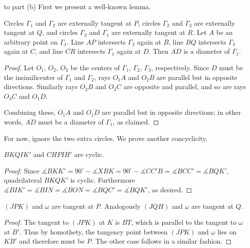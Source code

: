\begin{customsol}{to part (b)}
    First we present a well-known lemma.
    \begin{boxlemma*}[Folklore]
        Circles $\Gamma_1$ and $\Gamma_2$ are externally tangent at $P$, circles $\Gamma_2$ and $\Gamma_3$ are externally tangent at $Q$, and circles $\Gamma_3$ and $\Gamma_1$ are externally tangent at $R$. Let $A$ be an arbitrary point on $\Gamma_1$. Line $AP$ intersects $\Gamma_2$ again at $B$, line $BQ$ intersects $\Gamma_3$ again at $C$, and line $\overline{CR}$ intersects $\Gamma_1$ again at $D$. Then $\overline{AD}$ is a diameter of $\Gamma_1$.
    \end{boxlemma*}
    \begin{proof}
        Let $O_1$, $O_2$, $O_3$ be the centers of $\Gamma_1$, $\Gamma_2$, $\Gamma_3$, respectively. Since $D$ must be the insimilicenter of $\Gamma_1$ and $\Gamma_2$, rays $O_1A$ and $O_2B$ are parallel but in opposite directions. Similarly rays $O_2B$ and $O_3C$ are opposite and parallel, and so are rays $O_3C$ and $O_1D$.

        Combining these, $\overline{O_1A}$ and $\overline{O_1D}$ are parallel but in opposite directions; in other words, $\overline{AD}$ must be a diameter of $\Gamma_1$, as claimed.
    \end{proof}

    For now, ignore the two extra circles. We prove another concyclicity.
    \begin{iclaim}
        $BKQIK'$ and $CHPIH'$ are cyclic.
    \end{iclaim}
    \begin{proof}
        Since $\measuredangle BKK'=90^{\circ}-\measuredangle XBK=90^{\circ}-\measuredangle CC'B=\measuredangle BCC'=\measuredangle BQK'$, quadrilateral $BKQK'$ is cyclic. Furthermore $\measuredangle BIK'=\measuredangle BIN=\measuredangle BON=\measuredangle BQC'=\measuredangle BQK'$, as desired.
    \end{proof}
    \begin{iclaim}
        $(JPK)$ and $\omega$ are tangent at $P$. Analogously $(JQH)$ and $\omega$ are tangent at $Q$.
    \end{iclaim}
    \begin{proof}
        The tangent to $(JPK)$ at $K$ is $\overline{BT}$, which is parallel to the tangent to $\omega$ at $B'$. Thus by homothety, the tangency point between $(JPK)$ and $\omega$ lies on $\overline{KB'}$ and therefore must be $P$. The other case follows in a similar fashion.
    \end{proof}


\end{customsol}
